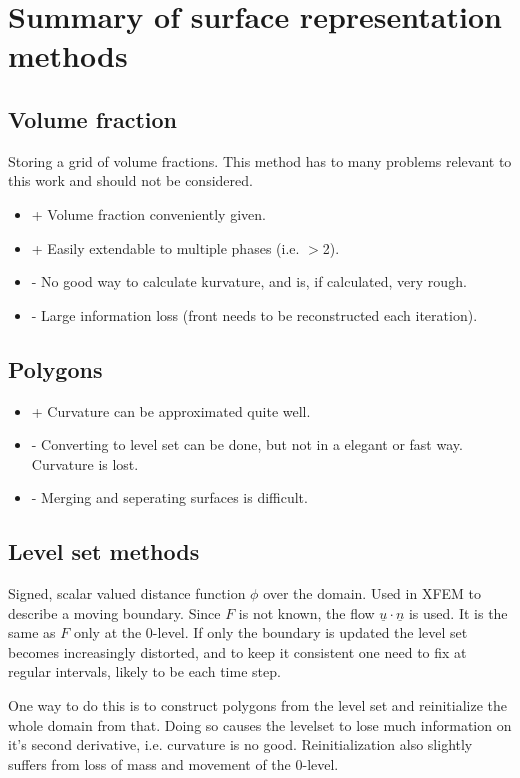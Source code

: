\documentclass[a4paper,10pt]{article}
\newcommand*\uv[1]{\underline{#1}}
\begin{document}
\section{Summary of surface representation methods}

\subsection{Volume fraction}
Storing a grid of volume fractions. This method has to many problems relevant to this work and should not be considered.
\begin{itemize}
\item + Volume fraction conveniently given.
\item + Easily extendable to multiple phases (i.e. $>$2).
\item - No good way to calculate kurvature, and is, if calculated, very rough.
\item - Large information loss (front needs to be reconstructed each iteration).
\end{itemize}

\subsection{Polygons}
\begin{itemize}
\item + Curvature can be approximated quite well.
\item - Converting to level set can be done, but not in a elegant or fast way. Curvature is lost.
\item - Merging and seperating surfaces is difficult. 
\end{itemize}

\subsection{Level set methods}
Signed, scalar valued distance function $\phi$ over the domain.
Used in XFEM to describe a moving boundary.
Since $F$ is not known, the flow $\uv{u}\cdot\uv{n}$ is used. It is the same as $F$ only at the 0-level.
If only the boundary is updated the level set becomes increasingly distorted, and to keep it consistent one need to 
fix at regular intervals, likely to be each time step.

One way to do this is to construct polygons from the level set and reinitialize the whole domain from that.
Doing so causes the levelset to lose much information on it's second derivative, i.e. curvature is no good.
Reinitialization also slightly suffers from loss of mass and movement of the 0-level.
\end{document}
